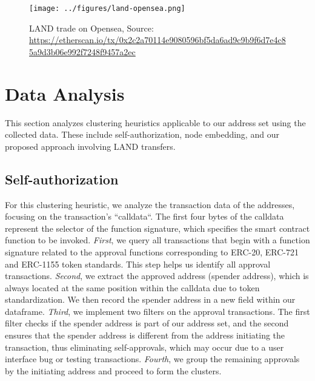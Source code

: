 \documentclass[12pt,a4paper,titlepage,oneside,english]{article}
\begin{document}
\begin{figure}[h!]
	\centering
	\texttt{[image: ../figures/land-opensea.png]}
	\caption{LAND trade on Opensea, Source: \url{https://etherscan.io/tx/0x2c2a70114e9080596bf5da6ad9c9b9f6d7e4c85a9d3b06e992f7248f9457a2ec}}
	\label{fig:LAND_example}
\end{figure} 



\section{Data Analysis}
This section analyzes clustering heuristics applicable to our address set using the collected data. These include self-authorization, node embedding, and our proposed approach involving LAND transfers.

\subsection{Self-authorization}

For this clustering heuristic, we analyze the transaction data of the addresses, focusing on the transaction's ``calldata``. The first four bytes of the calldata represent the selector of the function signature, which specifies the smart contract function to be invoked. \newline
\textit{First}, we query all transactions that begin with a function signature related to the approval functions corresponding to ERC-20, ERC-721 and ERC-1155 token standards. This step helps us identify all approval transactions. \newline
\textit{Second}, we extract the approved address (spender address), which is always located at the same position within the calldata due to token standardization. We then record the spender address in a new field within our dataframe. \newline
\textit{Third}, we implement two filters on the approval transactions. The first filter checks if the spender address is part of our address set, and the second ensures that the spender address is different from the address initiating the transaction, thus eliminating self-approvals, which may occur due to a user interface bug or testing transactions. \newline
\textit{Fourth}, we group the remaining approvals by the initiating address and proceed to form the clusters.
\end{document}
